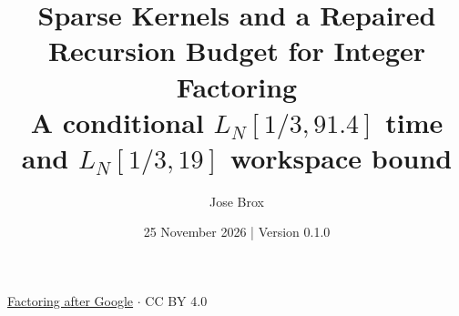 
\title{Sparse Kernels and a Repaired Recursion Budget for Integer Factoring\\[0.4em]\large A conditional $L_N[1/3,91.4]$ time and $L_N[1/3,19]$ workspace bound}
\renewcommand{\paperrunningtitle}{Conditional randomized factoring}
\author{Jose Brox}
\date{25 November 2026 \quad | \quad Version 0.1.0}

\maketitle
\begin{center}\small\href{https://github.com/JoseBrox/Factoring_after_Google}{Factoring after Google} $\cdot$ CC BY 4.0\end{center}

\clearpage



